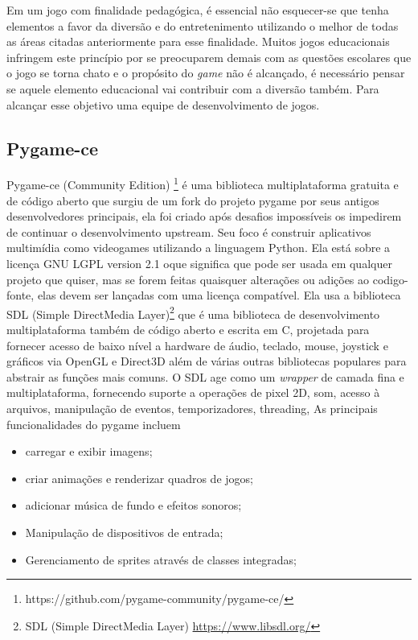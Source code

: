 Em um jogo com finalidade pedagógica, é essencial não esquecer-se que tenha elementos a favor da diversão e do entretenimento utilizando o melhor de todas as áreas citadas anteriormente para esse finalidade. Muitos jogos educacionais infringem este princípio por se preocuparem demais com as questões escolares que o jogo se torna chato e o propósito do \textit{game} não é alcançado, é necessário pensar se aquele elemento educacional vai contribuir com a diversão também. Para alcançar esse objetivo uma equipe de desenvolvimento de jogos.

\subsection{Pygame-ce}
\label{sec:pygame-ce}
Pygame-ce (Community Edition) \footnote{https://github.com/pygame-community/pygame-ce/} é uma biblioteca multiplataforma gratuita e de código aberto que surgiu de um fork do projeto pygame por seus antigos desenvolvedores principais, ela foi criado após desafios impossíveis os impedirem de continuar o desenvolvimento upstream. Seu foco é construir aplicativos multimídia como videogames utilizando a linguagem Python. Ela está sobre a licença GNU LGPL version 2.1 oque significa que pode ser usada em qualquer projeto que quiser, mas se forem feitas quaisquer alterações ou adições ao codigo-fonte, elas devem ser lançadas com uma licença compatível. 
 Ela usa a biblioteca SDL (Simple DirectMedia Layer)\footnote{SDL (Simple DirectMedia Layer) \url{https://www.libsdl.org/}} que é uma biblioteca de desenvolvimento multiplataforma também de código aberto e escrita em C, projetada para fornecer acesso de baixo nível a hardware de áudio, teclado, mouse, joystick e gráficos via OpenGL e Direct3D além de várias outras bibliotecas populares para abstrair as funções mais comuns. O SDL age como um \textit{wrapper} de camada fina e multiplataforma, fornecendo suporte a operações de pixel 2D, som, acesso à arquivos, manipulação de eventos, temporizadores, threading,
As principais funcionalidades do pygame incluem
\begin{itemize}
    \item carregar e exibir imagens;
    \item criar animações e renderizar quadros de jogos;
    \item adicionar música de fundo e efeitos sonoros;
    \item Manipulação de dispositivos de entrada;
    \item Gerenciamento de sprites através de classes integradas;
\end{itemize}

